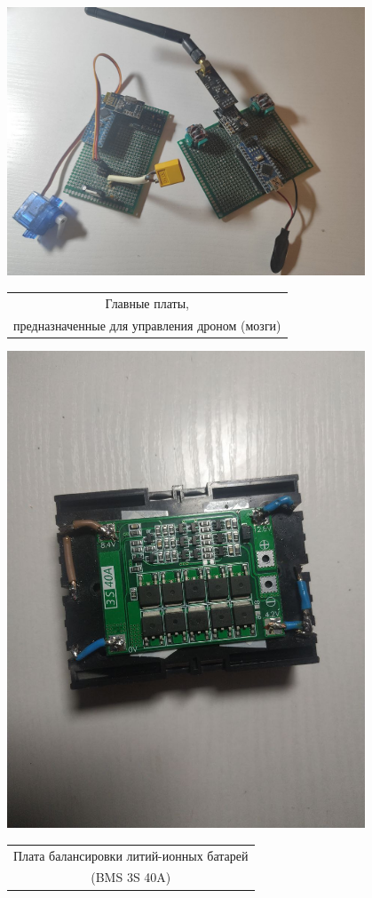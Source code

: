 \documentclass[a4paper,12pt]{article}
\begin{document}
	\begin{center}
		\includegraphics[width=0.8\textwidth]{plats.jpg}
		\begin{center}
			\begin{tabular}{c}
				Главные платы,\\предназначенные для управления дроном (мозги)
			\end{tabular}
		\end{center}
		
	\end{center}
	
	\begin{center}
		\includegraphics[width=0.8\textwidth]{balans.jpg}
		\begin{center}
			\begin{tabular}{c}
				Плата балансировки литий-ионных батарей\\(BMS 3S 40A)\\
			\end{tabular}
		\end{center}
		
	\end{center}
		

	
\end{document}
